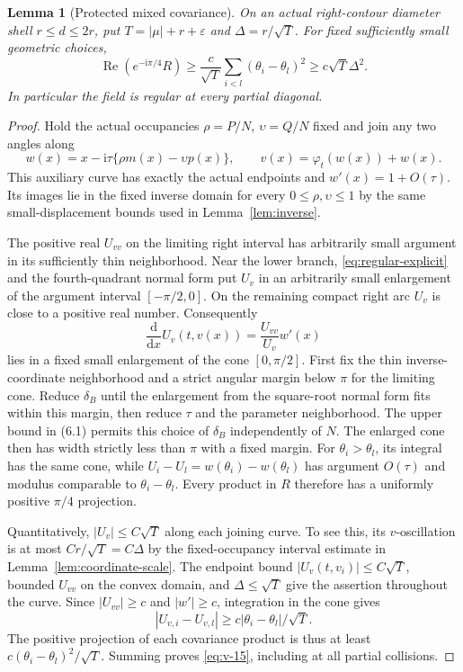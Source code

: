 \documentclass[11pt]{article}
\numberwithin{equation}{section}
\newtheorem{lemma}[theorem]{Lemma}
\theoremstyle{remark}\newtheorem{remark}[theorem]{Remark}
\newcommand{\ii}{\mathrm i}
\newcommand{\dd}{\mathrm d}
\newcommand{\Rea}{\operatorname{Re}}
\begin{document}
\begin{lemma}[Protected mixed covariance]\label{lem:covariance}
On an actual right-contour diameter shell $r\le d\le2r$, put
$T=|\mu|+r+\varepsilon$ and $\Delta=r/\sqrt T$.
For fixed sufficiently small geometric choices,
\begin{equation}\label{eq:v-15}
 \Rea(e^{-\ii\pi/4}R)
 \ge\frac c{\sqrt T}\sum_{i<l}(\theta_i-\theta_l)^2
 \ge c\sqrt T\Delta^2.
\end{equation}
In particular the field is regular at every partial diagonal.
\end{lemma}
\begin{proof}
Hold the actual occupancies $\rho=P/N$, $\upsilon=Q/N$ fixed and
join any two angles along
\[
 w(x)=x-\ii\tau\{\rho m(x)-\upsilon p(x)\},\qquad
 v(x)=\varphi_t(w(x))+w(x).
\]
This auxiliary curve has exactly the actual endpoints and
$w'(x)=1+O(\tau)$. Its images lie in the fixed inverse domain
for every $0\le\rho,\upsilon\le1$ by the same small-displacement
bounds used in Lemma~\ref{lem:inverse}.

The positive real $U_{vv}$ on the limiting right interval has
arbitrarily small argument in its sufficiently thin neighborhood.
Near the lower branch, \eqref{eq:regular-explicit} and the
fourth-quadrant normal form put $U_v$ in an arbitrarily small
enlargement of the argument interval $[-\pi/2,0]$.
On the remaining compact right arc $U_v$ is close to a positive
real number. Consequently
\[
 \frac{\dd}{\dd x}U_v(t,v(x))
       =\frac{U_{vv}}{U_v}w'(x)
\]
lies in a fixed small enlargement of the cone $[0,\pi/2]$.
First fix the thin inverse-coordinate neighborhood and a strict
angular margin below $\pi$ for the limiting cone. Reduce $\delta_B$
until the enlargement from the square-root normal form fits within
this margin, then reduce $\tau$ and the parameter neighborhood.
The upper bound in (6.1) permits this choice of $\delta_B$ independently
of $N$. The enlarged cone then has width strictly less than $\pi$
with a fixed margin.
For $\theta_i>\theta_l$, its integral has the same cone, while
$U_i-U_l=w(\theta_i)-w(\theta_l)$ has argument $O(\tau)$
and modulus comparable to $\theta_i-\theta_l$.
Every product in $R$ therefore has a uniformly positive
$\pi/4$ projection.

Quantitatively, $|U_v|\le C\sqrt T$ along each joining curve.
To see this, its $v$-oscillation is at most $C r/\sqrt T=C\Delta$
by the fixed-occupancy interval estimate in
Lemma~\ref{lem:coordinate-scale}. The endpoint bound
$|U_v(t,v_i)|\le C\sqrt T$, bounded $U_{vv}$ on the convex
domain, and $\Delta\le\sqrt T$ give the assertion throughout
the curve. Since $|U_{vv}|\ge c$ and $|w'|\ge c$, integration
in the cone gives
\[
 |U_{v,i}-U_{v,l}|\ge c|\theta_i-\theta_l|/\sqrt T.
\]
The positive projection of each covariance product is thus at least
$c(\theta_i-\theta_l)^2/\sqrt T$.
Summing proves \eqref{eq:v-15}, including at all partial collisions.
\end{proof}
\end{document}
